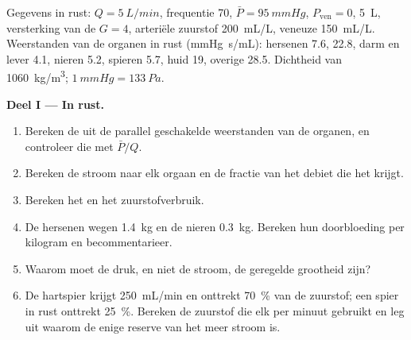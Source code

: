 \begin{problem}
\label{pb:b2:blood-pressure:1}
Gegevens in rust: $Q = \qty{5}{L/min}$, frequentie 70, $\bar P = \qty{95}{mmHg}$,
$P_{\text{ven}} = 0$,  \qty{5}{L}, versterking van de  $G = 4$,
arteriële zuurstof \qty{200}{mL/L}, veneuze \qty{150}{mL/L}. Weerstanden
van de organen in rust (\unit{mmHg.s/mL}): hersenen 7.6,  22.8, darm
en lever 4.1, nieren 5.2, spieren 5.7, huid 19, overige 28.5. Dichtheid van
 \qty{1060}{kg/m^3}; $\qty{1}{mmHg} = \qty{133}{Pa}$.

\medskip
\noindent\textbf{Deel I --- In rust.}
\begin{enumerate}
  \item Bereken de  uit de parallel geschakelde
        weerstanden van de organen, en controleer die met $\bar P/Q$.
  \item Bereken de stroom naar elk orgaan en de fractie van het debiet die
        het krijgt.
  \item Bereken het  en het zuurstofverbruik.
  \item De hersenen wegen \qty{1.4}{kg} en de nieren \qty{0.3}{kg}.
        Bereken hun doorbloeding per kilogram en becommentarieer.
  \item Waarom moet de druk, en niet de stroom, de geregelde grootheid zijn?
  \item De hartspier krijgt \qty{250}{mL/min} en onttrekt
        \qty{70}{\%} van de zuurstof; een spier in rust onttrekt
        \qty{25}{\%}. Bereken de zuurstof die elk per minuut gebruikt en leg
        uit waarom de enige reserve van het  meer stroom is.
\end{enumerate}


\end{problem}
